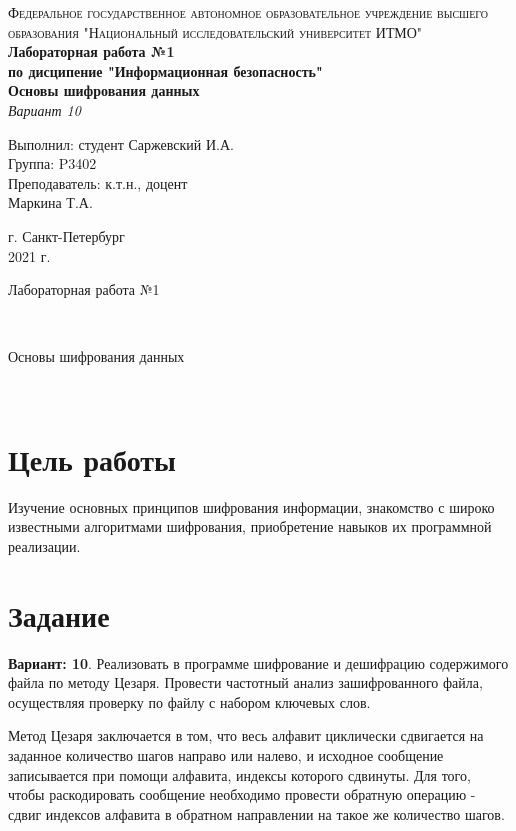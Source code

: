 \documentclass[12pt, a4paper]{article}
\begin{document}
\begin{titlepage}
\begin{center}

\textsc{Федеральное государственное автономное образовательное учреждение высшего\\
образования "Национальный исследовательский университет ИТМО"}
\vfill
\textbf{Лабораторная работа №1\\[4mm]
по дисципение "Информационная безопасность"\\[4mm]
Основы шифрования данных\\[4mm]
}
\textit{Вариант 10\\[20mm]}
\begin{flushright}
Выполнил: студент Саржевский И.А.
\\[2mm]Группа: P3402\\[4mm]
Преподаватель: к.т.н., доцент\\
Маркина Т.А.
\end{flushright}
\vfill
г. Санкт-Петербург\\[2mm]
2021 г.

\end{center}
\end{titlepage}

\begin{huge}Лабораторная работа №1\end{huge}\\[4mm]
\begin{Large}Основы шифрования данных\end{Large}\\

\section*{Цель работы}

Изучение основных принципов шифрования информации, знакомство
с широко известными алгоритмами шифрования, приобретение навыков
их программной реализации.

\section*{Задание}

\textbf{Вариант: 10}. Реализовать в программе шифрование и дешифрацию
содержимого файла по методу Цезаря. Провести частотный анализ
зашифрованного файла, осуществляя проверку по файлу с набором
ключевых слов.

Метод Цезаря заключается в том, что весь алфавит циклически сдвигается
на заданное количество шагов направо или налево, и исходное сообщение
записывается при помощи алфавита, индексы которого сдвинуты. Для того,
чтобы раскодировать сообщение необходимо провести обратную операцию -
сдвиг индексов алфавита в обратном направлении на такое же количество
шагов.
\end{document}
